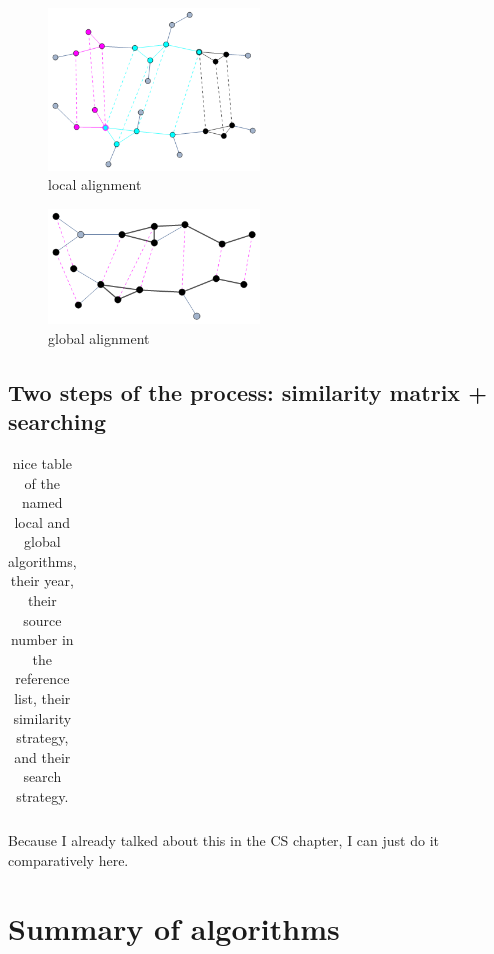 \documentclass[12pt]{thesis}
\theoremstyle{plain}
\theoremstyle{definition}
\theoremstyle{remark}
\begin{document}
{\begin{figure}
\centering
\includegraphics[width=0.5\textwidth]{local_alignment.png}
\caption{local alignment}
\label{fig:local_alignment}
\end{figure}

\begin{figure}
\centering
\includegraphics[width=0.5\textwidth]{global_alignment.png}
\caption{global alignment}
\label{fig:global_alignment}
\end{figure}

\subsection{Two steps of the process: similarity matrix + searching}

\begin{table}[h]
\centering
\begin{tabular}{|l|r|r|}
\hline
\end{tabular}
\caption{nice table of the named local and global algorithms, their year, their source number in the reference list, their similarity strategy, and their search strategy.}
\label{tab:alignment_algorithms}
\end{table}

Because I already talked about this in the CS chapter, I can just do it comparatively here.

\section{Summary of algorithms}







}
\end{document}
